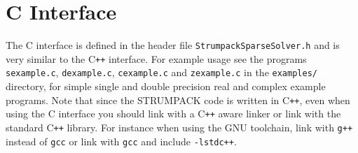 \documentclass{article}
\begin{document}

\section{C Interface} \label{sec:Cinterface} The C interface is
defined in the header file
\lstinline[style=C]!StrumpackSparseSolver.h! and is very similar to
the C\texttt{++} interface. For example usage see the programs
\lstinline[style=C]!sexample.c!, \lstinline[style=C]!dexample.c!,
\lstinline[style=C]!cexample.c! and \lstinline[style=C]!zexample.c!
in the \lstinline[style=C]!examples/! directory, for simple single and
double precision real and complex example programs. Note that since
the STRUMPACK code is written in C\texttt{++}, even when using the C
interface you should link with a C\texttt{++} aware linker or link
with the standard C\texttt{++} library. For instance when using the
GNU toolchain, link with \texttt{g++} instead of \texttt{gcc} or link
with \texttt{gcc} and include \texttt{-lstdc++}.
\end{document}
